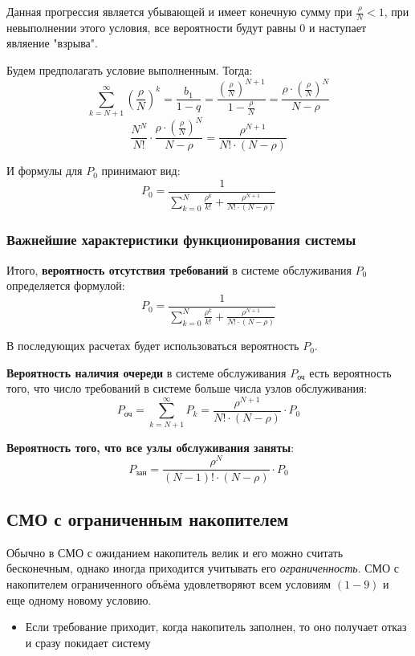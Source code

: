 \documentclass[aps,%
12pt,%
final,%
oneside,
onecolumn,%
musixtex, %
superscriptaddress,%
centertags]{article} %
\theoremstyle{plain}
\theoremstyle{definition}
\theoremstyle{remark}
\begin{document}
Данная прогрессия является убывающей и имеет конечную сумму при $\frac{\rho}{N} <1$, при невыполнении этого условия, все вероятности будут равны $0$ и наступает являение "взрыва".

Будем предполагать условие выполненным. Тогда:
$$\sum\limits_{k=N+1}^{\infty} \left(\frac{\rho}{N}\right)^k = \frac{b_1}{1-q} = \frac{\left(\frac{\rho}{N}\right)^{N+1}}{1-\frac{\rho}{N}} = \frac{\rho \cdot \left(\frac{\rho}{N}\right)^{N}}{N-\rho}$$
$$\frac{N^N}{N!} \cdot  \frac{\rho \cdot \left(\frac{\rho}{N}\right)^{N}}{N-\rho} = \frac{\rho^{N+1}}{N! \cdot (N-\rho)}$$

И формулы для $P_0$ принимают вид:
$$P_0 = \frac{1}{\sum\limits_{k=0}^N \frac{\rho^k}{k!} +\frac{\rho^{N+1}}{N! \cdot (N-\rho)}}$$
\subsubsection{Важнейшие характеристики функционирования системы}

Итого, \textbf{вероятность отсутствия требований} в системе обслуживания $P_0$ определяется формулой:
$$P_0 = \frac{1}{\sum\limits_{k=0}^N \frac{\rho^k}{k!} +\frac{\rho^{N+1}}{N! \cdot (N-\rho)}}$$

В последующих расчетах будет использоваться вероятность $P_0$.

\textbf{Вероятность наличия очереди} в системе обслуживания $P_{\text{оч}}$ есть вероятность того, что число требований в системе больше числа узлов обслуживания:
$$P_{\text{оч}} =\sum\limits_{k=N+1}^{\infty} P_k =  \frac{\rho^{N+1}}{N! \cdot (N-\rho)} \cdot P_0$$

\textbf{Вероятность того, что все узлы обслуживания заняты}:
$$P_{\text{зан}} =  \frac{\rho^{N}}{(N-1)! \cdot (N-\rho)} \cdot P_0$$


\newpage
\subsection{СМО с ограниченным накопителем}

Обычно в СМО с ожиданием накопитель велик и его можно считать бесконечным, однако иногда приходится учитывать его \textit{ограниченность}. СМО с накопителем ограниченного объёма удовлетворяют всем условиям $(1-9)$ и еще одному новому условию.

\begin{itemize}
	\item Если требование приходит, когда накопитель заполнен, то оно получает отказ и сразу покидает систему
\end{itemize}
\end{document}
